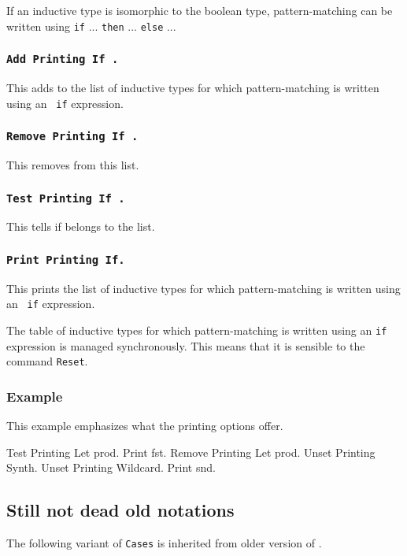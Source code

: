 If an inductive type is isomorphic to the boolean type,
pattern-matching can be written using {\tt if} ... {\tt then}
... {\tt else} ...

\subsubsection{\tt Add Printing If {\ident}.}
This adds {\ident} to the list
of inductive types for which pattern-matching is written using an {\tt
if} expression.

\subsubsection{\tt Remove Printing If {\ident}.}
This removes {\ident} from this list.

\subsubsection{\tt Test Printing If {\ident}.}
This tells if {\ident} belongs
to the list.

\subsubsection{\tt Print Printing If.}
This prints the list of inductive types
for which pattern-matching is written using an {\tt
if} expression.

The table of inductive types for which pattern-matching is written
using an {\tt if} expression is managed synchronously. This means that
it is sensible to the command {\tt Reset}.

\subsubsection{Example}

This example emphasizes what the printing options offer.

\begin{coq_example}
Test Printing Let prod.
Print fst.
Remove Printing Let prod.
Unset Printing Synth.
Unset Printing Wildcard.
Print snd.
\end{coq_example}

\subsection{Still not dead old notations}

The following variant of {\tt Cases} is inherited from older version
of {\Coq}. 

